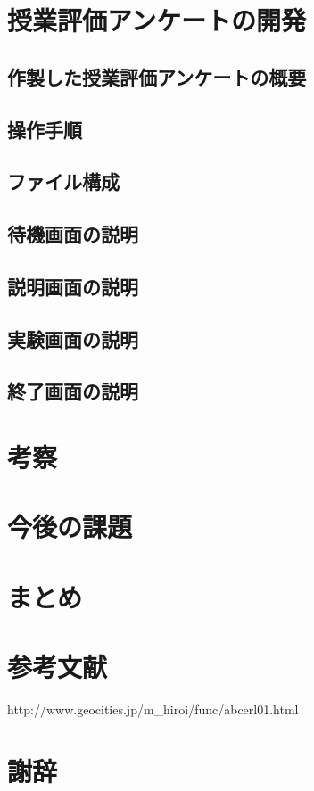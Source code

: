 \documentclass[11pt,a4paper]{jsarticle}
\begin{document}
\section{授業評価アンケートの開発}
\subsection{作製した授業評価アンケートの概要}
\subsection{操作手順}
\subsection{ファイル構成}
\subsection{待機画面の説明}
\subsection{説明画面の説明}
\subsection{実験画面の説明}
\subsection{終了画面の説明}
\section{考察}
\section{今後の課題}
\section{まとめ}
\section{参考文献}
http://www.geocities.jp/m_hiroi/func/abcerl01.html
\section{謝辞}
%
%
\end{document}

